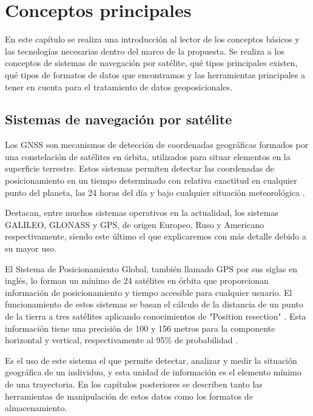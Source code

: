
\chapter{Conceptos principales} \label{chapter:PrincipalConcepts}
En este capítulo se realiza una introducción al lector de los conceptos básicos y las 
tecnologías necesarias dentro del marco de la propuesta. Se realiza a los conceptos de 
sistemas de navegación por satélite, qué tipos principales existen, qué tipos de 
formatos de datos que encontramos y las herramientas principales a tener en cuenta 
para el tratamiento de datos geoposicionales.

\section{Sistemas de navegación por satélite} \label{}
Los \ac{GNSS} son mecanismos de detección de coordenadas geográficas formados 
por una constelación de satélites en órbita, utilizados para situar elementos en la 
superficie terrestre. Estos sistemas permiten detectar las coordenadas de 
posicionamiento en un tiempo determinado con relativa exactitud en cualquier
punto del planeta, las 24 horas del día y bajo cualquier situación meteorológica 
\cite{Garrido-Villen01}.

Destacan, entre muchos sistemas operativos en la actualidad, los sistemas GALILEO, 
GLONASS y GPS, de origen Europeo, Ruso y Americano respectivamente, siendo este 
último el que explicaremos con más detalle debido a su mayor uso.

El Sistema de Posicionamiento Global, también llamado \ac{GPS} por sus siglas en 
inglés, lo forman un mínimo de 24 satélites en órbita que proporcionan información de 
posicionamiento y tiempo accesible para cualquier usuario. El funcionamiento de estos 
sistemas se basan el cálculo de la distancia de un punto de la tierra a tres satélites 
aplicando conocimientos de "Position resection" \cite{Langley01}.
Esta información tiene una precisión de 100 y 156 metros para la componente 
horizontal y vertical, respectivamente al 95$\%$ de probabilidad \cite{ElRabbany01}.

Es el uso de este sistema el que permite detectar, analizar y medir la situación 
geográfica de un individuo, y esta unidad de información es el elemento mínimo de una 
trayectoria. En los capítulos posteriores se describen tanto las herramientas de 
manipulación de estos datos como los formatos de almacenamiento.

